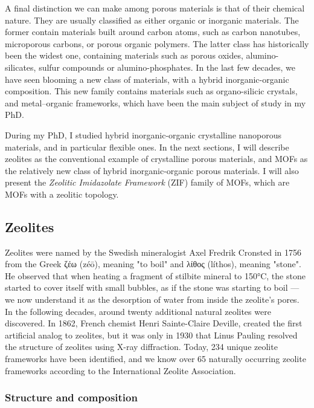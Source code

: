 \documentclass[thesis]{subfiles}
\begin{document}
A final distinction we can make among porous materials is that of their chemical
nature. They are usually classified as either organic or inorganic materials.
The former contain materials built around carbon atoms, such as carbon
nanotubes, microporous carbons, or porous organic polymers. The latter class has
historically been the widest one, containing materials such as porous oxides,
alumino-silicates, sulfur compounds or alumino-phosphates. In the last few
decades, we have seen blooming a new class of materials, with a hybrid
inorganic-organic composition. This new family contains materials such as
organo-silicic crystals, and metal--organic frameworks, which have been the main
subject of study in my PhD.

During my PhD, I studied hybrid inorganic-organic crystalline nanoporous
materials, and in particular flexible ones. In the next sections, I will
describe zeolites as the conventional example of crystalline porous materials,
and MOFs as the relatively new class of hybrid inorganic-organic porous
materials. I will also present the \emph{Zeolitic Imidazolate Framework} (ZIF)
family of MOFs, which are MOFs with a zeolitic topology.

\subsection{Zeolites}

Zeolites were named by the Swedish mineralogist Axel Fredrik Cronsted in
1756\cite{Ferey2001} from the Greek \textgreek{ζέω} (zéō), meaning "to boil" and
\textgreek{λίθος} (líthos), meaning "stone". He observed that when heating a
fragment of stilbite mineral to 150°C, the stone started to cover itself with
small bubbles, as if the stone was starting to boil --- we now understand it as
the desorption of water from inside the zeolite's pores. In the following decades,
around twenty additional natural zeolites were discovered. In 1862, French
chemist Henri Sainte-Claire Deville, created the first artificial analog to
zeolites, but it was only in 1930 that Linus Pauling resolved the structure of
zeolites using X-ray diffraction. Today, 234 unique zeolite frameworks have been
identified, and we know over 65 naturally occurring zeolite frameworks according
to the International Zeolite Association\cite{iza-website}.

\subsubsection{Structure and composition}
\end{document}
